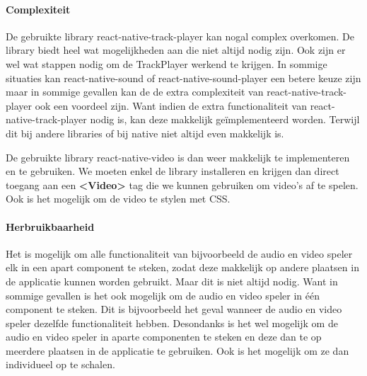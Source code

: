 \paragraph{Complexiteit}
De gebruikte library react-native-track-player kan nogal complex overkomen. De library 
biedt heel wat mogelijkheden aan die niet altijd nodig zijn. Ook zijn er wel wat stappen 
nodig om de TrackPlayer werkend te krijgen. In sommige situaties kan 
react-native-sound of react-native-sound-player een betere keuze zijn maar in sommige gevallen kan de 
de extra complexiteit van react-native-track-player ook een voordeel zijn. 
Want indien de extra functionaliteit van react-native-track-player nodig is,
kan deze makkelijk geïmplementeerd worden. Terwijl dit bij andere libraries of bij native 
niet altijd even makkelijk is.

De gebruikte library react-native-video is dan weer makkelijk te implementeren en te gebruiken.
We moeten enkel de library installeren en krijgen dan direct toegang aan een \textbf{<Video>} tag
die we kunnen gebruiken om video's af te spelen. Ook is het mogelijk om de video te stylen met CSS.

\paragraph{Herbruikbaarheid}
Het is mogelijk om alle functionaliteit van bijvoorbeeld de audio en video speler elk in een 
apart component te steken, zodat deze makkelijk op andere plaatsen in de applicatie kunnen worden 
gebruikt. Maar dit is niet altijd
nodig. Want in sommige gevallen is het ook mogelijk om de audio en video speler in één component
te steken. Dit is bijvoorbeeld het geval wanneer de audio en video speler dezelfde functionaliteit
hebben. Desondanks is het wel mogelijk om de audio en video speler in aparte componenten te steken
en deze dan te op meerdere plaatsen in de applicatie te gebruiken. Ook is het mogelijk om ze dan 
individueel op te schalen.
